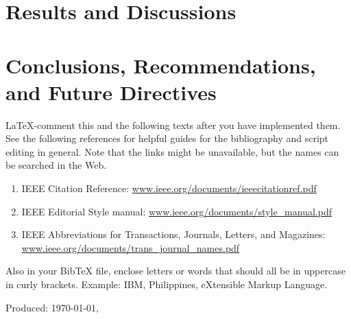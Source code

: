 \ifResultDiscuss
	\chapter{Results and Discussions}
	
	\cleardoublepage
\fi

\ifConc
	\chapter{Conclusions, Recommendations, and Future Directives}
	\label{ch:conc}
	
	\cleardoublepage
\fi

\renewcommand{\UrlFont}{\normalfont}
\begin{SingleSpace}
	{\small }
	\vfill
	\LaTeX-comment this and the following texts after you have implemented them. See the following references for helpful guides for the bibliography and script editing in general.  Note that the links might be unavailable, but the names can be searched in the Web.

	\begin{enumerate}
		\item IEEE Citation Reference: \url{www.ieee.org/documents/ieeecitationref.pdf}

		\item IEEE Editorial Style manual: \url{www.ieee.org/documents/style_manual.pdf}

		\item IEEE Abbreviations for Transactions, Journals, Letters, and Magazines: \url{www.ieee.org/documents/trans_journal_names.pdf}
	\end{enumerate}

	\noindent Also in your BibTeX file, enclose letters or words that should all be in uppercase in curly brackets. Example: {IBM}, {P}hilippines, e{X}tensible {M}arkup {L}anguage.

\end{SingleSpace}
\vfill
\begin{flushright}
	Produced: \usdate\today, \currenttime \\
\end{flushright}
\cleardoublepage

